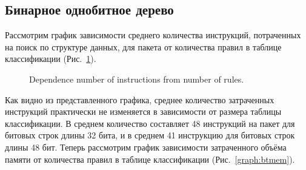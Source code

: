 \documentclass[conference]{IEEEtran}
\begin{document}
        \subsection{Бинарное однобитное дерево}
            Рассмотрим график зависимости среднего количества инструкций, потраченных на поиск по структуре данных, для пакета от количества правил в таблице классификации (Рис.~\ref{graph:btinst}).
            \begin{figure}[!htbp]
                \centering
                \captionsetup{justification=centering}
                \caption{Dependence number of instructions from number of rules.}
                \label{graph:btinst}
            \end{figure}
            Как видно из представленного графика, среднее количество затраченных инструкций практически не изменяется в зависимости от размера таблицы классификации. 
            В среднем количество составляет 48 инструкций на пакет для битовых строк длины 32 бита, и в среднем 41 инструкцию для битовых строк длины 48 бит.
            Теперь рассмотрим график зависимости затраченного объёма памяти от количества правил в таблице классификации (Рис.~\ref{graph:btmem}).
\end{document}
